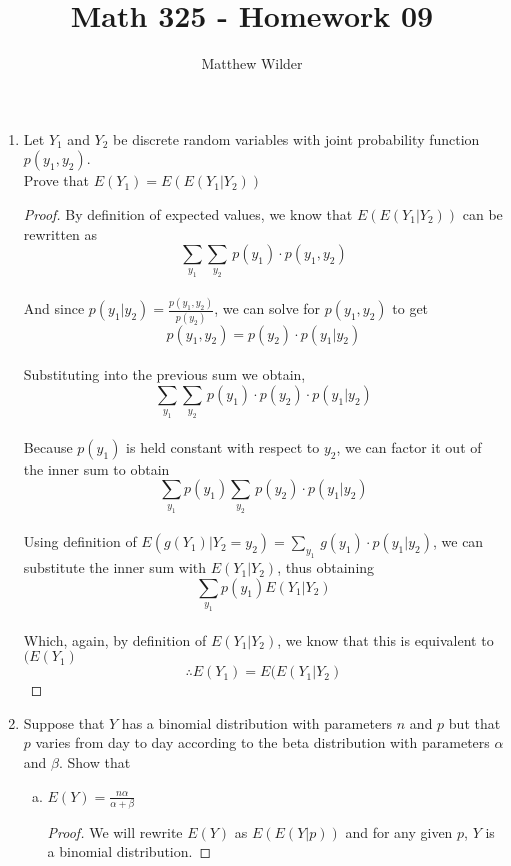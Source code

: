 \documentclass[11pt]{article}
\title{Math 325 - Homework 09}
\author{Matthew Wilder}
\begin{document}
\maketitle

\begin{enumerate}
  \item Let \(Y_1\) and \(Y_2\) be discrete random variables with joint probability function \(p(y_1, y_2)\).
      \\Prove that \(E(Y_1) = E(E(Y_1|Y_2))\)
      \begin{proof}
      By definition of expected values, we know that \(E(E(Y_1|Y_2))\) can be rewritten as
      \\$$\sum_{y_1}\sum_{y_2}\,p(y_1) \cdot p(y_1, y_2)$$	
      \\And since \(p(y_1 | y_2) = \frac{p(y_1, y_2)}{p(y_2)}\), we can solve for \(p(y_1, y_2)\) to get
      \\$$p(y_1, y_2) = p(y_2)\cdot p(y_1 | y_2)$$
      \\Substituting into the previous sum we obtain,
      \\$$\sum_{y_1}\sum_{y_2}\,p(y_1) \cdot p(y_2) \cdot p(y_1 | y_2)$$
      \\Because \(p(y_1)\) is held constant with respect to \(y_2\), we can factor it out of the inner sum to obtain
      \\$$\sum_{y_1}p(y_1)\sum_{y_2}\,p(y_2) \cdot p(y_1 | y_2)$$
      \\Using definition of \(E(g(Y_1) | Y_2=y_2) = \sum_{y_1}\,g(y_1) \cdot p(y_1 | y_2)\), we can substitute the inner sum with \(E(Y_1 | Y_2)\), thus obtaining
      \\$$\sum_{y_1}p(y_1) E(Y_1 | Y_2)$$
      \\Which, again, by definition of \(E(Y_1 | Y_2)\), we know that this is equivalent to \((E(Y_1)\)
      $$\boxed{\therefore E(Y_1) = E(E(Y_1 | Y_2)}$$
      \end{proof}
  \item Suppose that \(Y\) has a binomial distribution with parameters \(n\) and \(p\)
  but that \(p\) varies from day to day according to the beta distribution with parameters \(\alpha\) and \(\beta\). Show that
    \begin{enumerate}[(a)]
        \item \(E(Y) = \frac{n \alpha}{\alpha + \beta} \)
        \begin{proof}
            We will rewrite \(E(Y)\) as \(E(E(Y|p))\) and for any given \(p\), \(Y\) is a binomial distribution.

\end{proof}
\end{enumerate}
\end{enumerate}
\end{document}
